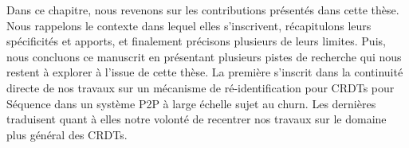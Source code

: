 Dans ce chapitre, nous revenons sur les contributions présentés dans cette thèse.
Nous rappelons le contexte dans lequel elles s'inscrivent, récapitulons leurs spécificités et apports, et finalement précisons plusieurs de leurs limites.
Puis, nous concluons ce manuscrit en présentant plusieurs pistes de recherche qui nous restent à explorer à l'issue de cette thèse.
La première s'inscrit dans la continuité directe de nos travaux sur un mécanisme de ré-identification pour \acp{CRDT} pour Séquence dans un système \ac{P2P} à large échelle sujet au churn.
Les dernières traduisent quant à elles notre volonté de recentrer nos travaux sur le domaine plus général des \acp{CRDT}.
